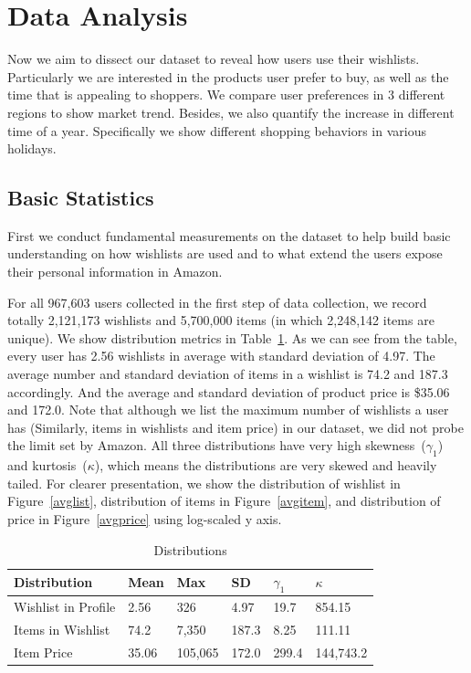 \section{Data Analysis}

Now we aim to dissect our dataset to reveal how users use their wishlists. Particularly we are interested in the products user prefer to buy, as well as the time that is appealing to shoppers. We compare user preferences in 3 different regions to show market trend. Besides, we also quantify the increase in different time of a year. Specifically we show different shopping behaviors in various holidays.

\subsection{Basic Statistics}
First we conduct fundamental measurements on the dataset to help build basic understanding on how wishlists are used and to what extend the users expose their personal information in Amazon. 

For all 967,603 users collected in the first step of data collection, we record totally 2,121,173 wishlists and 5,700,000 items (in which 2,248,142 items are unique). We show distribution metrics in Table~\ref{tb:stat2}. As we can see from the table, every user has 2.56 wishlists in average with standard deviation of 4.97. The average number and standard deviation of items in a wishlist is 74.2 and 187.3 accordingly. And the average and standard deviation of product price is \$35.06 and 172.0. Note that although we list the maximum number of wishlists a user has (Similarly, items in wishlists and item price) in our dataset, we did not probe the limit set by Amazon. All three distributions have very high skewness~($\gamma_1$) and kurtosis~($\kappa$), which means the distributions are very skewed and heavily tailed. For clearer presentation, we show the distribution of wishlist in Figure~\ref{avglist}, distribution of items in Figure~\ref{avgitem}, and distribution of price in Figure~\ref{avgprice} using log-scaled y axis.

\begin{table}[!htbp]
\centering
\caption{Distributions}
\label{tb:stat2}
\begin{adjustbox}{max width=.5\textwidth}
\begin{tabular}{llllll}
Distribution & Mean & Max & SD & $\gamma_1$ & $\kappa$ \\ \hline
Wishlist in Profile & 2.56 & 326 & 4.97 & 19.7 & 854.15 \\
Items in Wishlist & 74.2 & 7,350 & 187.3 & 8.25 & 111.11 \\
Item Price & 35.06 & 105,065 & 172.0 & 299.4 & 144,743.2 \\
\end{tabular}
\end{adjustbox}
\end{table}

